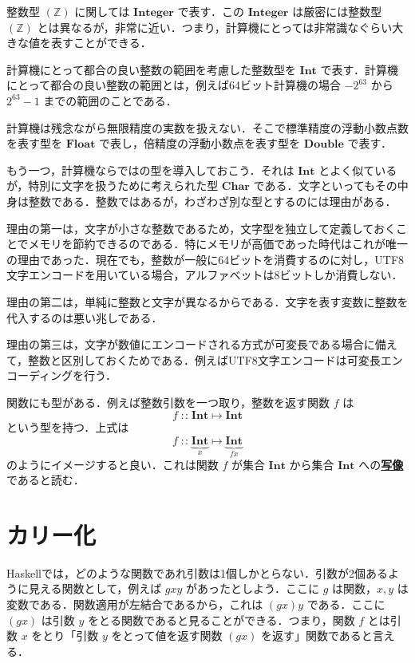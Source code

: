 \documentclass[a4paper,twocolumn]{jsbook}
\newcommand{\programminglanguage}[1]{\textsf{#1}}
\newcommand{\haskell}{\programminglanguage{Haskell}}
\newcommand{\keyword}[1]{{\underline{\textbf{#1}}}}
\DeclareMathOperator{\mIn}{{:\!:}}
\DeclareMathOperator{\mMapsTo}{\mapsto}
\newcommand{\mSpecialSet}[1]{\mathbb{#1}} %
\newcommand{\mZSet}{\mSpecialSet{Z}}
\newcommand{\mType}[1]{\mathbf{#1}}
\newcommand{\mCharType}{\mType{Char}}
\newcommand{\mFloatType}{\mType{Float}}
\newcommand{\mDoubleType}{\mType{Double}}
\newcommand{\mIntType}{\mType{Int}}
\newcommand{\mIntegerType}{\mType{Integer}}
\newcommand{\mProj}[2]{#1\mMapsTo#2}
\begin{document}
整数型 $(\mZSet)$ に関しては $\mIntegerType$ で表す．この $\mIntegerType$ は厳密には整数型 $(\mZSet)$ とは異なるが，非常に近い．つまり，計算機にとっては非常識なぐらい大きな値を表すことができる．

計算機にとって都合の良い整数の範囲を考慮した整数型を $\mIntType$ で表す．計算機にとって都合の良い整数の範囲とは，例えば64ビット計算機の場合 $-2^{63}$ から $2^{63}-1$ までの範囲のことである．

計算機は残念ながら無限精度の実数を扱えない．そこで標準精度の浮動小数点数を表す型を $\mFloatType$ で表し，倍精度の浮動小数点を表す型を $\mDoubleType$ で表す．

もう一つ，計算機ならではの型を導入しておこう．それは $\mIntType$ とよく似ているが，特別に文字を扱うために考えられた型 $\mCharType$ である．文字といってもその中身は整数である．整数ではあるが，わざわざ別な型とするのには理由がある．

理由の第一は，文字が小さな整数であるため，文字型を独立して定義しておくことでメモリを節約できるのである．特にメモリが高価であった時代はこれが唯一の理由であった．現在でも，整数が一般に64ビットを消費するのに対し，UTF8文字エンコードを用いている場合，アルファベットは8ビットしか消費しない．

理由の第二は，単純に整数と文字が異なるからである．文字を表す変数に整数を代入するのは悪い兆しである．

理由の第三は，文字が数値にエンコードされる方式が可変長である場合に備えて，整数と区別しておくためである．例えばUTF8文字エンコードは可変長エンコーディングを行う．

関数にも型がある．例えば整数引数を一つ取り，整数を返す関数 $f$ は
\begin{equation}
f\mIn\mProj{\mIntType}{\mIntType}
\end{equation}
という型を持つ．上式は
\begin{equation}
f
\mIn\underbrace{\mIntType}_{x}
\mMapsTo
\underbrace{\mIntType}_{fx}
\end{equation}
のようにイメージすると良い．これは関数 $f$ が集合 $\mIntType$ から集合 $\mIntType$ への\keyword{写像}であると読む．

\section{カリー化}

\haskell では，どのような関数であれ引数は1個しかとらない．引数が2個あるように見える関数として，例えば $gxy$ があったとしよう．ここに $g$ は関数，$x,y$ は変数である．関数適用が左結合であるから，これは $\left(gx\right)y$ である．ここに $\left(gx\right)$ は引数 $y$ をとる関数であると見ることができる．つまり，関数 $f$ とは引数 $x$ をとり「引数 $y$ をとって値を返す関数 $\left(gx\right)$ を返す」関数であると言える．
\end{document}
